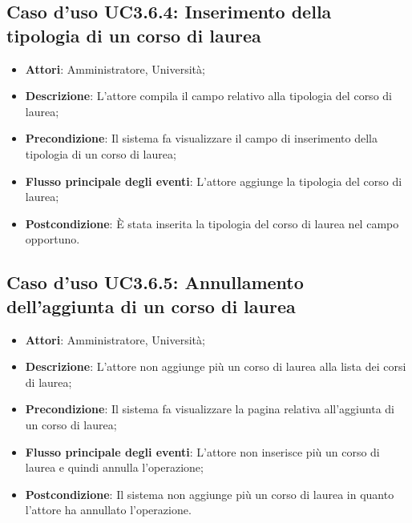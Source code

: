 \subsection{Caso d'uso \texorpdfstring{UC3.6.4}{UC3.6.4}: Inserimento della tipologia di un corso di laurea}
\begin{itemize}
	\item \textbf{Attori}: Amministratore, Università;
	\item \textbf{Descrizione}: L'attore compila il campo relativo alla tipologia del corso di laurea;
	\item \textbf{Precondizione}: Il sistema fa visualizzare il campo di inserimento della tipologia di un corso di laurea;
	\item \textbf{Flusso principale degli eventi}: L'attore aggiunge la tipologia del corso di laurea;
	\item \textbf{Postcondizione}: È stata inserita la tipologia del corso di laurea nel campo opportuno.
\end{itemize}
\subsection{Caso d'uso \texorpdfstring{UC3.6.5}{UC3.6.5}: Annullamento dell'aggiunta di un corso di laurea}
\begin{itemize}
	\item \textbf{Attori}: Amministratore, Università;
	\item \textbf{Descrizione}: L'attore non aggiunge più un corso di laurea alla lista dei corsi di laurea;
	
	\item \textbf{Precondizione}: Il sistema fa visualizzare la pagina relativa all'aggiunta di un corso di laurea;
	
	\item \textbf{Flusso principale degli eventi}: L'attore non inserisce più un corso di laurea e quindi annulla l'operazione;
	
	\item \textbf{Postcondizione}: Il sistema non aggiunge più un corso di laurea in quanto l'attore ha annullato l'operazione.
	
\end{itemize}
